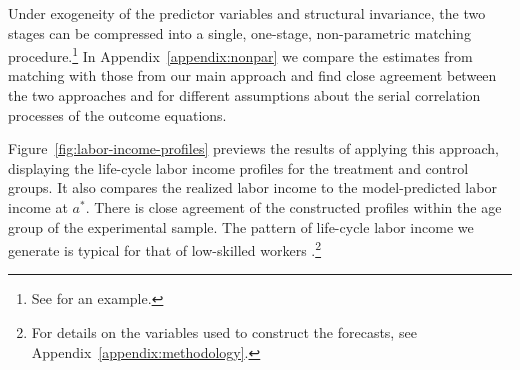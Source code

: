 Under exogeneity of the predictor variables and structural invariance, the two stages can be compressed into a single, one-stage, non-parametric matching procedure.\footnote{See \citet{Heckman_Ichimura_etal_1998_Econometrica} for an example.} In  Appendix~\ref{appendix:nonpar} we compare the estimates from matching with those from our main approach and find close agreement between the two approaches and for different assumptions about the serial correlation processes of the outcome equations.

Figure~\ref{fig:labor-income-profiles} previews the results of applying this approach, displaying the life-cycle labor income profiles for the treatment and control groups. It also compares the realized labor income to the model-predicted labor income at $a^*$. There is close agreement of the constructed profiles within the age group of the experimental sample. The pattern of life-cycle labor income we generate is typical for that of low-skilled workers \citep{Blundell-etal_2015_J-Pub-E,Gladden_Taber_2000_WageProgression,Sanders-Taber_2012_AR,Lagakos_Moll_etal_2016_LifeCycle_NBER}.\footnote{For details on the variables used to construct the forecasts, see  Appendix~\ref{appendix:methodology}.}

